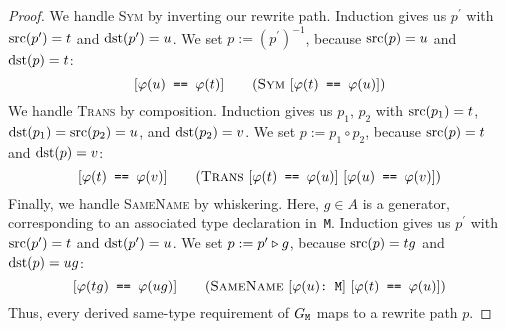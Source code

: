 \documentclass[../generics]{subfiles}
\begin{document}
\begin{proof}
\InductiveStep We handle \textsc{Sym} by inverting our rewrite path. Induction gives us $p^\prime$ with $\operatorname{src}(p^\prime)=t$ and $\operatorname{dst}(p^\prime)=u$. We set $p:=(p^\prime)^{-1}$, because $\operatorname{src}(p)=u$ and $\operatorname{dst}(p)=t$:
\[\SameReqPhi{u}{t}\tag{\textsc{Sym} $\SameReqPhi{t}{u}$}\]
We handle \textsc{Trans} by composition. Induction gives us $p_1$, $p_2$ with $\operatorname{src}(p_1)=t$, $\operatorname{dst}(p_1)=\operatorname{src}(p_2)=u$, and $\operatorname{dst}(p_2)=v$. We set $p:=p_1\circ p_2$, because $\operatorname{src}(p)=t$ and $\operatorname{dst}(p)=v$:
\[\SameReqPhi{t}{v}\tag{\textsc{Trans} $\SameReqPhi{t}{u}$ $\SameReqPhi{u}{v}$}\]
Finally, we handle \textsc{SameName} by whiskering. Here, $g\in A$ is a generator, corresponding to an associated type declaration in~\texttt{M}. Induction gives us $p^\prime$ with $\operatorname{src}(p^\prime)=t$ and $\operatorname{dst}(p^\prime)=u$. We set $p:=p^\prime\triangleright g$, because $\operatorname{src}(p)=tg$ and $\operatorname{dst}(p)=ug$:
\[\SameReqPhi{tg}{ug}\tag{\textsc{SameName} $\ConfReqPhi{u}$ $\SameReqPhi{t}{u}$}\]
Thus, every derived same-type requirement of $G_\texttt{M}$ maps to a rewrite path $p$.
\end{proof}
\end{document}
